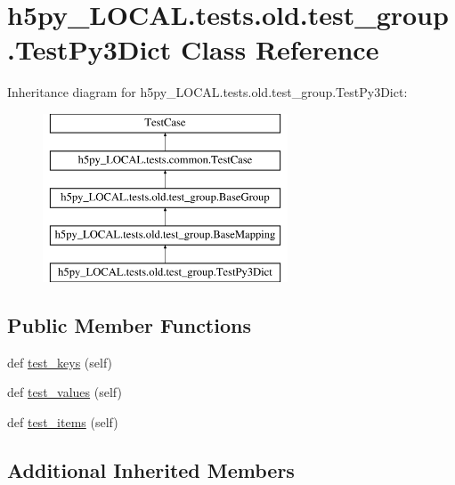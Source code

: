 \hypertarget{classh5py__LOCAL_1_1tests_1_1old_1_1test__group_1_1TestPy3Dict}{}\section{h5py\+\_\+\+L\+O\+C\+A\+L.\+tests.\+old.\+test\+\_\+group.\+Test\+Py3\+Dict Class Reference}
\label{classh5py__LOCAL_1_1tests_1_1old_1_1test__group_1_1TestPy3Dict}
Inheritance diagram for h5py\+\_\+\+L\+O\+C\+A\+L.\+tests.\+old.\+test\+\_\+group.\+Test\+Py3\+Dict\+:\begin{figure}[H]
\begin{center}
\leavevmode
\includegraphics[height=5.000000cm]{classh5py__LOCAL_1_1tests_1_1old_1_1test__group_1_1TestPy3Dict}
\end{center}
\end{figure}
\subsection*{Public Member Functions}
\begin{DoxyCompactItemize}
\item 
def \hyperlink{classh5py__LOCAL_1_1tests_1_1old_1_1test__group_1_1TestPy3Dict_a05491dc603f1370a6cef58c37a2fa367}{test\+\_\+keys} (self)
\item 
def \hyperlink{classh5py__LOCAL_1_1tests_1_1old_1_1test__group_1_1TestPy3Dict_a9f8eda8a96f8a67a73a678b6d9278789}{test\+\_\+values} (self)
\item 
def \hyperlink{classh5py__LOCAL_1_1tests_1_1old_1_1test__group_1_1TestPy3Dict_a558098a39be201f17d49d9b4ae4787ba}{test\+\_\+items} (self)
\end{DoxyCompactItemize}
\subsection*{Additional Inherited Members}


